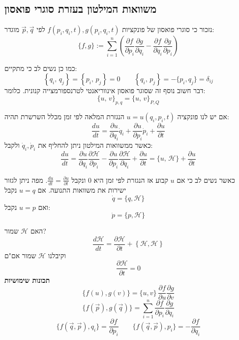 \documentclass{tstextbook}
\begin{document}
\subsection{משוואות המילטון בעזרת סוגרי פואסון}

נזכור כי סוגרי פואסון של פונקציות \(f(p_{i},q_{i},t),g(p_{i},q_{i},t)\) לפי \(\vec{p},\vec{q}\) מוגדר:
$$\{f,g\}:=\sum_{i=1}^{n}\left({\frac{\partial f}{\partial p_{i}}}{\frac{\partial g}{\partial q_{i}}}-{\frac{\partial f}{\partial q_{i}}}{\frac{\partial g}{\partial p_{i}}}\right)$$

כמו כן נשים לב כי מתקיים:
$$\left\{ q_{i},\,q_{j} \right\}=\left\{ p_{i},\,p_{j} \right\}=0 \qquad \left\{ q_{i},\,p_{j} \right\}=-\{p_{i},q_{j}\}=\delta_{i j}$$
דבר חשוב נוסף זה שסוגר פואסון אינווריאנטי לטרנספורמצייה קנונית. כלומר:
$$\{u,\,v\}_{p,q}=\{u,\,v\}_{{P},{ Q}}$$

אם יש לנו פונקציה \(u=u(q_{i},p_{i},t)\) הנגזרת המלאה לפי זמן מכלל השרשרת תהיה:
$${\frac{d u}{d t}}={\frac{\partial u}{\partial q_{i}}}{\dot{q}}_{i}+{\frac{\partial u}{\partial p_{i}}}{\dot{p}}_{i}+{\frac{\partial u}{\partial t}}$$
כאשר ממשוואות המילטון ניתן להחליף את \(\dot{q}_{i},\dot{p}_{i}\) ולקבל:
$${{\displaystyle{\frac{d u}{d t}}=\frac{\partial u}{\partial q_{i}}\frac{\partial \mathcal{\mathcal{H}}}{\partial p_{i}}-\frac{\partial u}{\partial p_{i}}\frac{\partial \mathcal{\mathcal{H}}}{\partial q_{i}}+\frac{\partial u}{\partial t}}} {{\displaystyle{=\{u,\,\mathcal{\mathcal{H}}\}+\frac{\partial u}{\partial t}}}}$$

כאשר נשים לב כי אם \(u\) קבוע אז הנגזרת לפי זמן היא 0 ונקבל \(\frac{du}{dt}=\frac{\partial u}{\partial t}\). מפה ניתן לגזור ישירות את משוואות התנועה. אם \(u=q\) נקבל 
$$\dot{q}=\{q,\mathcal{\mathcal{H}}\}$$
ואם \(u=p\) נקבל:
$${\dot{p}}=\{p,\mathcal{\mathcal{H}}\}$$

\begin{example}
האם \(\mathcal{\mathcal{\mathcal{H}}}\) שמור?
$$\frac{d\mathcal{\mathcal{\mathcal{H}}}}{dt}=\frac{\partial \mathcal{\mathcal{\mathcal{H}}}}{\partial t}+\left\{  \mathcal{\mathcal{\mathcal{H}}},\mathcal{\mathcal{\mathcal{H}}}  \right\}$$
וקיבלנו \(\mathcal{\mathcal{\mathcal{H}}}\) שמור אם"ם $$\frac{\partial \mathcal{\mathcal{\mathcal{H}}}}{\partial t}=0$$\textbf{תכונות שימושיות}$$\{f(u),g(v)\}=\{u,v\}\,\frac{\partial f}{\partial u}\frac{\partial g}{\partial v}$$$$\{f(\vec{p}),g(\vec{q})\}=\sum_{i=1}^{n}\frac{\partial f}{\partial p_{i}}\frac{\partial g}{\partial q_{i}}$$$$\{f\left(\vec{q},\vec{p}\right),q_{i}\}=\frac{\partial f}{\partial p_{i}}\qquad\{f\left(\vec{q},\vec{p}\right),p_{i}\}=-\frac{\partial f}{\partial q_{i}}$$

\end{example}
\end{document}
